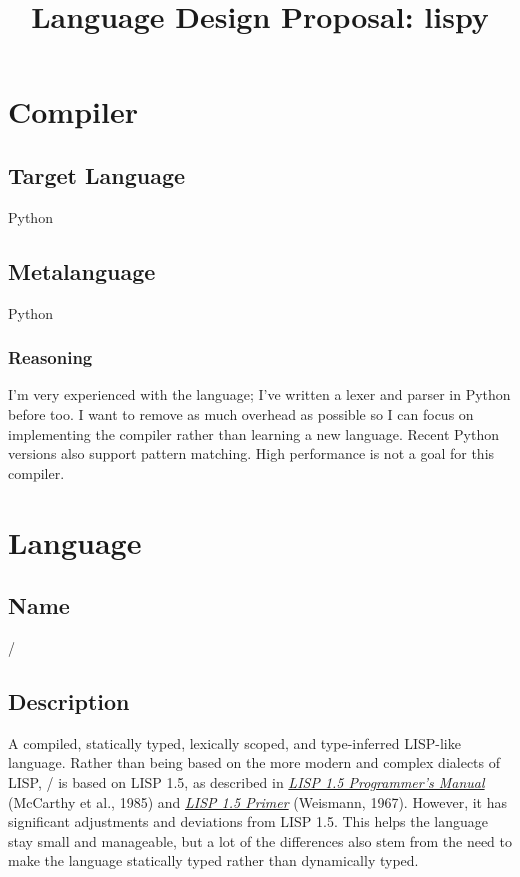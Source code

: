 \documentclass[a4paper, 12pt]{article}
\title{Language Design Proposal: lispy}
\begin{document}
\maketitle

\section{Compiler}
\subsection{Target Language}
Python

\subsection{Metalanguage}
Python

\subsubsection{Reasoning}
I'm very experienced with the language; I've written a lexer and parser in Python before too. I want to remove as much overhead as possible so I can focus on implementing the compiler rather than learning a new language. Recent Python versions also support pattern matching. High performance is not a goal for this compiler.

\section{Language}
\subsection{Name}
\lispy/

\subsection{Description}
A compiled, statically typed, lexically scoped, and type-inferred LISP-like language. Rather than being based on the more modern and complex dialects of LISP, \lispy/ is based on LISP 1.5, as described in \href{https://www.lispmachine.net/books/LISP_1.5_Programmers_Manual.pdf}{\textit{LISP 1.5 Programmer's Manual}} (McCarthy et al., 1985) and \href{http://www.softwarepreservation.org/projects/LISP/book/Weismann_LISP1.5_Primer_1967.pdf}{\textit{LISP 1.5 Primer}} (Weismann, 1967). However, it has significant adjustments and deviations from LISP 1.5. This helps the language stay small and manageable, but a lot of the differences also stem from the need to make the language statically typed rather than dynamically typed.
\end{document}
